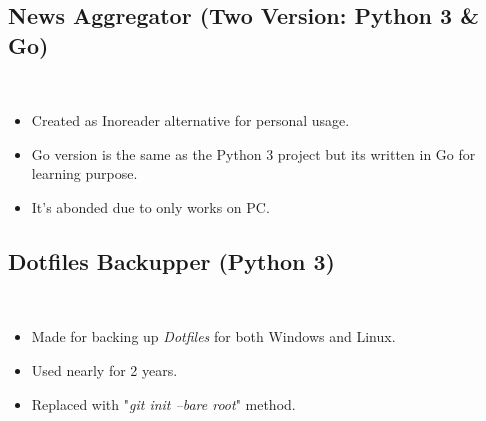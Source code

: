 \documentclass[a4paper, 9pt]{extarticle}
\begin{document}
\subsection{News Aggregator (Two Version: Python 3 \& Go)} \hfill \\
\begin{itemize}
	\item Created as Inoreader alternative for personal usage.
	\item Go version is the same as the Python 3 project but its written in Go
	for learning purpose.
	\item It's abonded due to only works on PC.
\end{itemize}


\subsection{Dotfiles Backupper (Python 3)} \hfill \\
\begin{itemize}
	\item Made for backing up \emph{Dotfiles} for both Windows and Linux.
	\item Used nearly for 2 years.
	\item Replaced with "\emph{git init --bare root}" method.
\end{itemize}

\newpage

\mylanguages{}
\mytechnicalskillsb{}
\mycertificates{}

\end{document}
